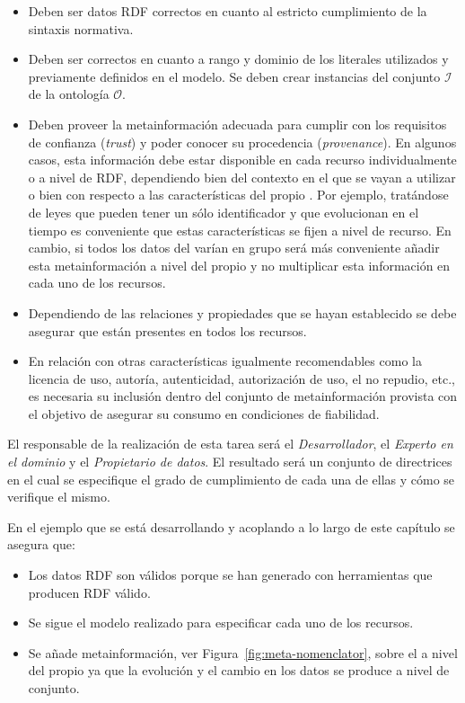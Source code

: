\begin{itemize}
 \item Deben ser datos RDF correctos en cuanto al estricto cumplimiento de la sintaxis normativa.
 \item Deben ser correctos en cuanto a rango y dominio de los literales
utilizados y previamente definidos en el modelo. Se deben crear instancias del conjunto
$\mathcal{I}$ de la ontología $\mathcal{O}$.
\item Deben proveer la metainformación adecuada para cumplir con los requisitos de confianza (\textit{trust})
y poder conocer su procedencia (\textit{provenance}). En algunos casos, esta información debe estar disponible
en cada recurso individualmente o a nivel de \dataset RDF, dependiendo bien del contexto en el que se vayan
a utilizar o bien con respecto a las características del propio \dataset. Por ejemplo, tratándose de leyes que pueden
tener un sólo identificador y que evolucionan en el tiempo es conveniente que estas características
se fijen a nivel de recurso. En cambio, si todos los datos del \dataset varían en grupo será más conveniente
añadir esta metainformación a nivel del propio \dataset y no multiplicar esta información en cada
uno de los recursos.
\item Dependiendo de las relaciones y propiedades que se hayan establecido se debe asegurar que 
están presentes en todos los recursos.
\item En relación con otras características igualmente recomendables como la licencia de uso, autoría, autenticidad, autorización de uso, el no repudio, etc., 
es necesaria su inclusión dentro del conjunto de metainformación provista con el objetivo de asegurar su consumo en condiciones de fiabilidad.
\end{itemize}

El responsable de la realización de esta tarea será el \textit{Desarrollador}, el \textit{Experto en el dominio} y el \textit{Propietario de datos}. 
El resultado será un conjunto de directrices en el cual se especifique el grado de cumplimiento de cada una de ellas y cómo se verifique 
el mismo.

En el ejemplo que se está desarrollando y acoplando a lo largo de este capítulo se asegura que:
\begin{itemize}
 \item Los datos RDF son válidos porque se han generado con herramientas que producen RDF válido.
 \item Se sigue el modelo realizado para especificar cada uno de los recursos.
 \item Se añade metainformación, ver Figura~\ref{fig:meta-nomenclator}, sobre el \dataset a nivel del propio \dataset ya que la evolución
y el cambio en los datos se produce a nivel de conjunto.
\end{itemize}

